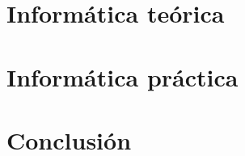 \documentclass[openany]{book}
\begin{document}





\part{Informática teórica}





 

\part{Informática práctica}





\part{Conclusión}


 



\renewcommand{\chaptername}{}
\printbibliography[heading=bibintoc]
\nocite{*}
\end{document}
